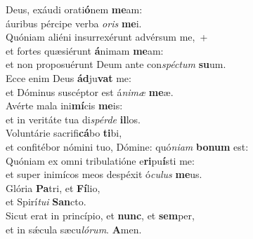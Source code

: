 \evenverse Deus, exáudi orati\textbf{ó}nem \textbf{me}am:~\*\\
\evenverse áuribus pércipe verba \textit{o}\textit{ris} \textbf{me}i.\\
\oddverse Quóniam aliéni insurrexérunt advérsum me,~+\\
\oddverse  et fortes quæsiérunt \textbf{á}nimam \textbf{me}am:~\*\\
\oddverse et non proposuérunt Deum ante con\textit{spé}\textit{ctum} \textbf{su}um.\\
\evenverse Ecce enim Deus \textbf{ád}ju\textbf{vat} me:~\*\\
\evenverse et Dóminus suscéptor est á\textit{ni}\textit{mæ} \textbf{me}æ.\\
\oddverse Avérte mala ini\textbf{mí}cis \textbf{me}is:~\*\\
\oddverse et in veritáte tua di\textit{spér}\textit{de} \textbf{il}los.\\
\evenverse Voluntárie sacrifi\textbf{cá}bo \textbf{ti}bi,~\*\\
\evenverse et confitébor nómini tuo, Dómine: quó\textit{ni}\textit{am} \textbf{bo}\textbf{num} est:\\
\oddverse Quóniam ex omni tribulatióne e\textbf{ri}pu\textbf{í}sti me:~\*\\
\oddverse et super inimícos meos despéxit ó\textit{cu}\textit{lus} \textbf{me}us.\\
\evenverse Glória \textbf{Pa}tri, et \textbf{Fí}lio,~\*\\
\evenverse et Spirí\textit{tu}\textit{i} \textbf{San}cto.\\
\oddverse Sicut erat in princípio, et \textbf{nunc}, et \textbf{sem}per,~\*\\
\oddverse et in sǽcula sæcu\textit{ló}\textit{rum}. \textbf{A}men.\\
